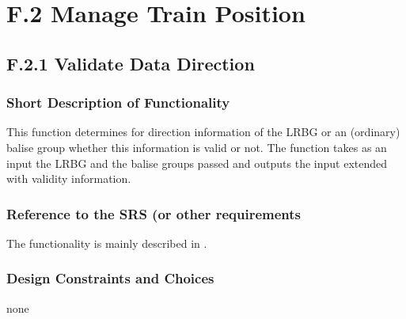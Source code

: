 \documentclass{template/openetcs_report}
\begin{document}
\section{F.2 Manage Train Position}


\subsection{F.2.1 Validate Data Direction}

\subsubsection{Short Description of Functionality}
This function determines for direction information of the LRBG or an (ordinary) balise group whether this information is valid or not. The function takes as an input the LRBG and the balise groups passed and outputs the input extended with validity information.

\subsubsection{Reference to the SRS (or other requirements}
The functionality is mainly described in \cite[Chapter~3.6.3]{subset-026}.

\subsubsection{Design Constraints and Choices}
none



\appendix


%
%
%
%


\newpage
{}
\printindex

\end{document}
